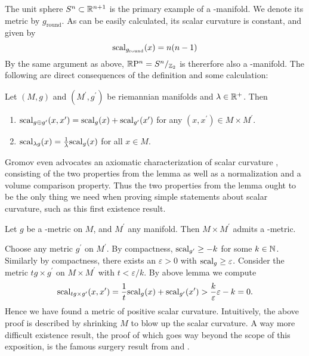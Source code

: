 The unit sphere $S^n\subset \mathbb{R}^{n+1}$ is the primary example of a \psc-manifold.
We denote its metric by $g_{\text{round}}$.
As can be easily calculated, its scalar curvature is constant, and given by 
\begin{equation*}
    \mathrm{scal}_{g_{\text{round}}}(x) = n(n-1)
\end{equation*}
By the same argument as above, $\mathbb{R}\mathrm{P}^n = S^n/_{\mathbb{Z}_2}$ is thererfore also a \psc-manifold.
The following are direct consequences of the definition and some calculation:
\begin{thesislemma}
    Let $(M,g)$ and $(M^\prime, g^\prime)$ be riemannian manifolds and $\lambda\in\mathbb{R}^+$. Then
    \begin{enumerate}[label=\roman*.,noitemsep]
        \item $\mathrm{scal}_{g\oplus g^\prime}(x,x^\prime) = \mathrm{scal}_g(x) + \mathrm{scal}_{g^\prime}(x^\prime)$ for any $(x,x^\prime)\in M\times M^\prime$.
        \item $\mathrm{scal}_{\lambda g}(x) = \frac{1}{\lambda} \mathrm{scal}_g(x)$ for all $x\in M$.
    \end{enumerate}
\end{thesislemma}
Gromov even advocates an axiomatic characterization of scalar curvature \cite{grom:four}, consisting of the two properties from the lemma as well as a normalization and a volume comparison property.
Thus the two properties from the lemma ought to be the only thing we need when proving simple statements about scalar curvature, such as this first existence result.
\begin{thesisprop}\label{prodpsc}
    Let $g$ be a \psc-metric on $M$, and $M^\prime$ any manifold. Then $M\times M^\prime$ admits a \psc-metric.
\end{thesisprop}
\prf
Choose any metric $g^\prime$ on $M^\prime$.
By compactness, $\mathrm{scal}_{g^\prime} \geq -k$ for some $k\in \mathbb{N}$.
Similarly by compactness, there exists an $\varepsilon > 0$ with $\mathrm{scal}_g \geq \varepsilon$.
Consider the metric $tg \times g^\prime$ on $M\times M^\prime$ with $t < \varepsilon / k$.
By above lemma we compute
\begin{equation*}
    \mathrm{scal}_{tg \times g^\prime}(x,x^\prime) = \frac{1}{t}\mathrm{scal}_g(x) + \mathrm{scal}_{g^\prime}(x^\prime) > \frac{k}{\varepsilon} \varepsilon - k = 0.
\end{equation*}
Hence we have found a metric of positive scalar curvature.
\endprf
Intuitively, the above proof is described by shrinking $M$ to blow up the scalar curvature.
A way more difficult existence result, the proof of which goes way beyond the scope of this exposition, is the famous surgery result from \cite{gl:scpsc} and \cite{sy:scpsc}.
